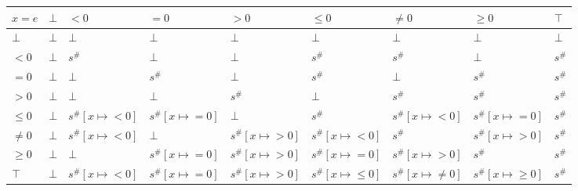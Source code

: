 \documentclass{article}
\begin{document}
    \begin{table}[]
        \begin{tabular}{|l|l|l|l|l|l|l|l|l|}
        \hline
        $x = e$ & $\bot$ & $<0$                 & $=0$                 & $>0$                 & $\le 0$                 & $\ne 0$                 & $\ge 0$                 & $\top$ \\ \hline
        $\bot$  & $\bot$ & $\bot$               & $\bot$               & $\bot$               & $\bot$                  & $\bot$                  & $\bot$                  & $\bot$ \\ \hline
        $<0$    & $\bot$ & $s^\#$               & $\bot$               & $\bot$               & $s^\#$                  & $s^\#$                  & $\bot$                  & $s^\#$ \\ \hline
        $=0$    & $\bot$ & $\bot$               & $s^\#$               & $\bot$               & $s^\#$                  & $\bot$                  & $s^\#$                  & $s^\#$ \\ \hline
        $>0$    & $\bot$ & $\bot$               & $\bot$               & $s^\#$               & $\bot$                  & $s^\#$                  & $s^\#$                  & $s^\#$ \\ \hline
        $\le 0$ & $\bot$ & $s^\#[x \mapsto <0]$ & $s^\#[x \mapsto =0]$ & $\bot$               & $s^\#$                  & $s^\#[x \mapsto <0]$    & $s^\#[x \mapsto =0]$    & $s^\#$ \\ \hline
        $\ne 0$ & $\bot$ & $s^\#[x \mapsto <0]$ & $\bot$               & $s^\#[x \mapsto >0]$ & $s^\#[x \mapsto <0]$    & $s^\#$                  & $s^\#[x \mapsto >0]$    & $s^\#$ \\ \hline
        $\ge 0$ & $\bot$ & $\bot$               & $s^\#[x \mapsto =0]$ & $s^\#[x \mapsto >0]$ & $s^\#[x \mapsto =0]$    & $s^\#[x \mapsto >0]$    & $s^\#$                  & $s^\#$ \\ \hline
        $\top$  & $\bot$ & $s^\#[x \mapsto <0]$ & $s^\#[x \mapsto =0]$ & $s^\#[x \mapsto >0]$ & $s^\#[x \mapsto \le 0]$ & $s^\#[x \mapsto \ne 0]$ & $s^\#[x \mapsto \ge 0]$ & $s^\#$ \\ \hline
        \end{tabular}
        \end{table}
\end{document}
